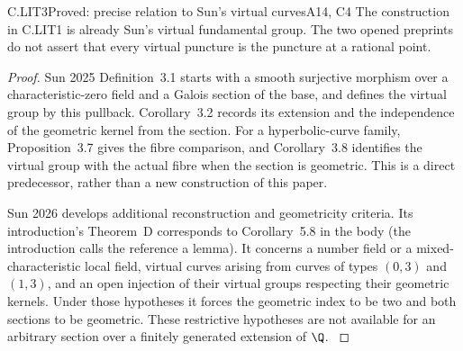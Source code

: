 \begin{claim}{C.LIT3}{Proved: precise relation to Sun's virtual curves}{A14, C4}
The construction in C.LIT1 is already Sun's virtual fundamental group.
The two opened preprints do not assert that every virtual puncture is
the puncture at a rational point.
\end{claim}
\begin{proof}
Sun 2025 Definition~3.1 starts with a smooth surjective morphism over
a characteristic-zero field and a Galois section of the base, and defines
the virtual group by this pullback. Corollary~3.2 records its extension
and the independence of the geometric kernel from the section.
For a hyperbolic-curve family, Proposition~3.7 gives the fibre comparison,
and Corollary~3.8 identifies the virtual group with the actual fibre
when the section is geometric. This is a direct predecessor, rather
than a new construction of this paper.

Sun 2026 develops additional reconstruction and geometricity criteria.
Its introduction's Theorem~D corresponds to Corollary~5.8 in the body
(the introduction calls the reference a lemma). It concerns a number
field or a mixed-characteristic local field, virtual curves arising
from curves of types $(0,3)$ and $(1,3)$, and an open injection of their
virtual groups respecting their geometric kernels. Under those
hypotheses it forces the geometric index to be two and both sections
to be geometric. These restrictive hypotheses are not available for
an arbitrary section over a finitely generated extension of $\Q$.
\citep[Definition~3.1, Corollary~3.2, Proposition~3.7 and
Corollary~3.8]{LA_Sun2025}
\citep[Theorem~D and Corollary~5.8]{LA_Sun2026}
\end{proof}

